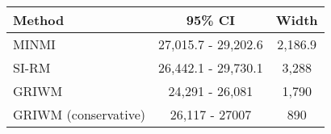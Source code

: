 
\begin{tabular}{lcc}
\toprule
Method & 95\% CI & Width\\
\midrule
MINMI & 27,015.7 - 29,202.6 & 2,186.9\\
SI-RM & 26,442.1 - 29,730.1 & 3,288\\
GRIWM & 24,291 - 26,081 & 1,790\\
GRIWM (conservative) & 26,117 - 27007 & 890\\
\bottomrule
\end{tabular}
